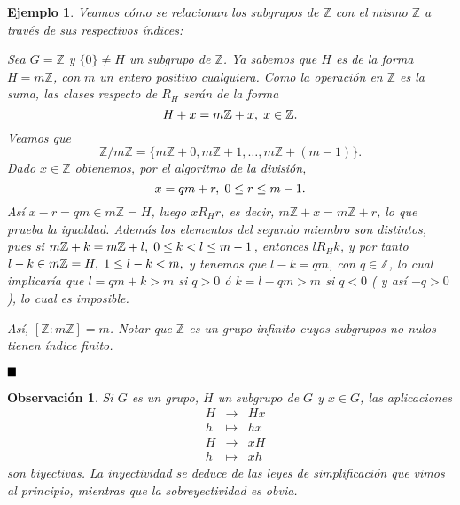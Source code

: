 \documentclass[12pt]{article}
\newtheorem{example}{Ejemplo}[theorem]
\newtheorem{observation}{Observación}[theorem]
\begin{document}
\begin{example} Veamos cómo se relacionan los subgrupos de $\mathbb{Z}$ con el mismo $\mathbb{Z}$ a través de sus respectivos índices:

Sea $G = \mathbb{Z}$ y $\lbrace 0 \rbrace \neq H$ un subgrupo de $\mathbb{Z}$. Ya sabemos que $H$ es de la forma $H = m\mathbb{Z}$, con $m$ un entero positivo cualquiera. Como la operación en $\mathbb{Z}$ es la \textit{suma}, las clases respecto de $R_{H}$ serán de la forma $$H + x = m\mathbb{Z} + x, \hspace{0.1cm} x \in \mathbb{Z}.$$ Veamos que $$\mathbb{Z}/m\mathbb{Z} = \lbrace m\mathbb{Z} + 0, m\mathbb{Z} + 1, \ldots, m\mathbb{Z} + (m-1)\rbrace.$$ Dado $x \in \mathbb{Z}$ obtenemos, por el algoritmo de la división, $$x = qm + r, \hspace{0.1cm} 0\leq r\leq m-1.$$ Así $x-r = qm \in m\mathbb{Z} = H$, luego $xR_{H}r$, es decir, $m\mathbb{Z} + x = m\mathbb{Z} + r$, lo que prueba la igualdad. Además los elementos del segundo miembro son distintos, pues si $m\mathbb{Z} + k = m\mathbb{Z} + l, \hspace{0.1cm} 0\leq k < l \leq m-1$, entonces $lR_{H}k$, y por tanto $l-k \in m\mathbb{Z} = H, \hspace{0.1cm} 1\leq l-k <m,$ y tenemos que $l-k = qm$, con $q \in \mathbb{Z}$, lo cual implicaría que $l = qm +k > m$ si $q>0$ ó $k = l - qm >m$ si $q < 0$ ( y así $-q >0$), lo cual es imposible.

Así, $\left[ \mathbb{Z}:m\mathbb{Z} \right] = m$. Notar que $\mathbb{Z}$ es un grupo infinito cuyos subgrupos no nulos tienen índice finito.
\end{example}

$\hfill \blacksquare$

\begin{observation}\label{ob:preL} Si $G$ es un grupo, $H$ un subgrupo de $G$ y $x \in G$, las aplicaciones $$
\begin{array}{rccl}
&H & \longrightarrow &Hx\\
&h & \longmapsto &hx
\end{array}
$$
$$
\begin{array}{rccl}
&H & \longrightarrow &xH\\
&h & \longmapsto &xh
\end{array}
$$ son biyectivas. La inyectividad se deduce de las leyes de simplificación que vimos al principio, mientras que la sobreyectividad es obvia.
\end{observation}
\end{document}

